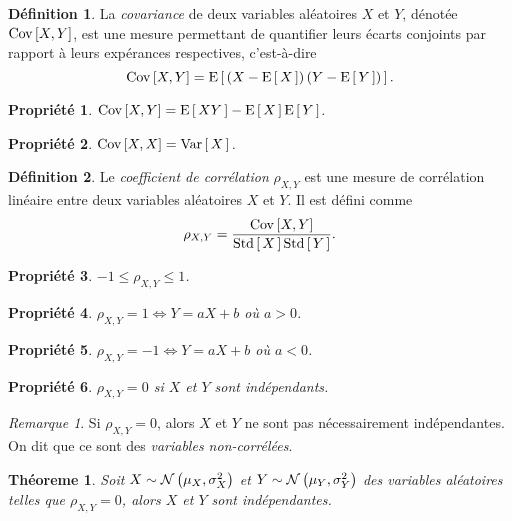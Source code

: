\documentclass[11pt]{article}
\makeatletter
\newcommand\Norm[2]{%
	\ensuremath{%
		\mathcal{N}\left(#1,#2\right)%
	}%
}%
\newcommand\Esp[1]{%
	\ensuremath{%
		\mathrm{E}\left[\,#1\,\right]%
	}%
}%
\newcommand\Var[1]{%
	\ensuremath{%
		\mathrm{Var}\left[\,#1\,\right]%
	}%
}%
\newcommand\Std[1]{%
	\ensuremath{%
		\mathrm{Std}\left[\,#1\,\right]%
	}%
}%
\newcommand\Cov[2]{%
	\ensuremath{%
		\mathrm{Cov}\left[#1,#2\right]%
	}%
}%
\newtheorem{theoreme}{Théoreme}[section]
\newtheorem{property}{Propriété}
\theoremstyle{remark}
\newtheorem*{remark}{Remarque}
\theoremstyle{definition}
\newtheorem*{@definition}{Définition}
\newenvironment{definition}{%
	\begin{@definition}%
}{%
	\end{@definition}%
	\setcounter{property}{0}%
}
\makeatother
\begin{document}
\begin{definition}
	La \textit{covariance} de deux variables aléatoires $X$ et $Y$, dénotée
	$\Cov{X}{Y}$, est une mesure permettant de quantifier leurs écarts
	conjoints par rapport à leurs expérances respectives, c'est-à-dire
	\begin{equation*}
		\Cov{X}{Y}=\Esp{\left(X-\Esp{X}\right)\left(Y-\Esp{Y}\right)}.
	\end{equation*}
\end{definition}

\begin{property}
	$\Cov{X}{Y}=\Esp{XY}-\Esp{X}\Esp{Y}$.
\end{property}

\begin{property}
	$\Cov{X}{X}=\Var{X}$.
\end{property}

\begin{definition}
	Le \textit{coefficient de corrélation} $\rho_{X,Y}$ est une mesure de
	corrélation linéaire entre deux variables aléatoires $X$ et $Y$. Il est
	défini comme
	\begin{equation*}
		\rho_{X,Y}=\frac{\Cov{X}{Y}}{\Std{X}\Std{Y}}.
	\end{equation*}
\end{definition}

\begin{property}
	$-1\leq\rho_{X,Y}\leq 1$.
\end{property}

\begin{property}
	$\rho_{X,Y}=1\Leftrightarrow Y=aX+b$ où $a>0$.
\end{property}

\begin{property}
	$\rho_{X,Y}=-1\Leftrightarrow Y=aX+b$ où $a<0$.
\end{property}

\begin{property}
	$\rho_{X,Y}=0$ si $X$ et $Y$ sont indépendants.
\end{property}

\begin{remark}
	Si $\rho_{X,Y}=0$, alors $X$ et $Y$ ne sont pas nécessairement
	indépendantes. On dit que ce sont des \textit{variables non-corrélées}.
\end{remark}

\begin{theoreme}
	Soit $X\sim\Norm{\mu_X}{\sigma_X^2}$ et $Y\sim\Norm{\mu_Y}{\sigma_Y^2}$ des
	variables aléatoires telles que $\rho_{X,Y}=0$, alors $X$ et $Y$ sont
	indépendantes.
\end{theoreme}
\end{document}
